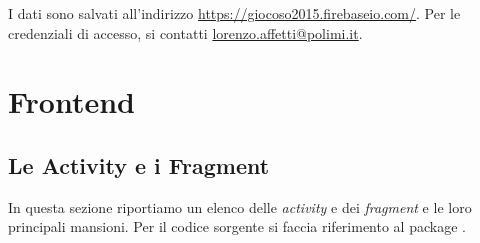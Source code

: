I dati sono salvati all'indirizzo \url{https://giocoso2015.firebaseio.com/}. Per le credenziali di accesso, si contatti \url{lorenzo.affetti@polimi.it}.

\section{Frontend}

\subsection{Le Activity e i Fragment}
\label{subsec:activities}
In questa sezione riportiamo un elenco delle \textit{activity} e dei \textit{fragment} e le loro principali mansioni.
Per il codice sorgente si faccia riferimento al package .

\newcommand{\includescreenshot}[2]{
\begin{figure}[h!]
\centering{
\texttt{[image: screenshots/\#1.png]}}
\caption{#2}
\label{fig:#1}
\end{figure}
}

